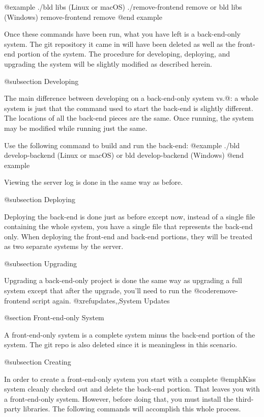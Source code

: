 @example
./bld libs                   (Linux or macOS)
./remove-frontend remove
    or
bld libs                     (Windows)
remove-frontend remove
@end example

Once these commands have been run, what you have left is a back-end-only system.  The git 
repository it came in will have been deleted as well as the front-end portion of the system.
The procedure for developing, deploying, and upgrading the system will be slightly modified as 
described herein.


@subsection Developing

The main difference between developing on a back-end-only system vs.@: a 
whole system is just that the command used to start the back-end is
slightly different.  The locations of all the back-end pieces are
the same.  Once running, the system may be modified while running just
the same.

Use the following command to build and run the back-end:
@example
./bld develop-backend         (Linux or macOS)
     or
bld develop-backend           (Windows)
@end example

Viewing the server log is done in the same way as before.


@subsection Deploying

Deploying the back-end is done just as before except now, instead of a single file containing the whole system, 
you have a single file that represents the back-end only.  When deploying the front-end and back-end portions,
they will be treated as two separate systems by the server.

@subsection Upgrading

Upgrading a back-end-only project is done the same way as upgrading a full system except that after the upgrade, you'll need to run the 
@code{remove-frontend} script again. @xref{updates,,System Updates}

@section Front-end-only System

A front-end-only system is a complete system minus the back-end portion of the system.
The git repo is also deleted since it is meaningless in this scenario.

@subsection Creating

In order to create a front-end-only system you start with a complete
@emph{Kiss} system cleanly checked out and delete the back-end
portion.  That leaves you with a front-end-only system.  However, before
doing that, you must install the third-party libraries.  The following
commands will accomplish this whole process.

